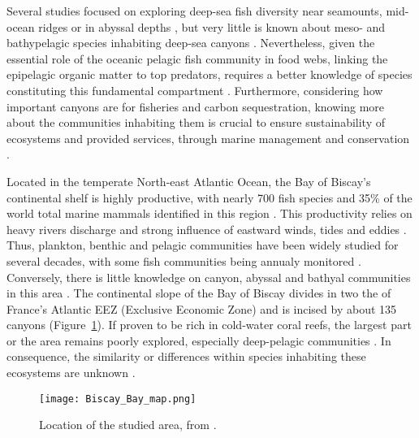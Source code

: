 
Several studies focused on exploring deep-sea fish diversity near seamounts, mid-ocean ridges or in abyssal depths \citep{cook2013,sutton2013}, but very little is known about meso- and bathypelagic species inhabiting deep-sea canyons \citep{kenchington2020}. Nevertheless, given the essential role of the oceanic pelagic fish community in food webs, linking the epipelagic organic matter to top predators, requires a better knowledge of species constituting this fundamental compartment \citep{davison2015,gaskett2001}. Furthermore, considering how important canyons are for fisheries and carbon sequestration, knowing more about the communities inhabiting them is crucial to ensure sustainability of ecosystems and provided services, through marine management and conservation \citep{fernandez-arcaya2017,vandenbeld2017a}.

Located in the temperate North-east Atlantic Ocean, the Bay of Biscay's continental shelf is highly productive, with nearly 700 fish species and 35\% of the world total marine mammals identified in this region \citep{borja2019}. This productivity relies on heavy rivers discharge and strong influence of eastward winds, tides and eddies \citep{borja2019,akpinar2020}. Thus, plankton, benthic and pelagic communities have been widely studied for several decades, with some fish communities being annualy monitored \citep{borja2019,doray2018}. Conversely, there is little knowledge on canyon, abyssal and bathyal communities in this area \citep{borja2019}. The continental slope of the Bay of Biscay divides in two the of France's Atlantic EEZ (Exclusive Economic Zone) and is incised by about 135 canyons \citep{bourillet2006,spitz2019,vandenbeld2017} (Figure~\ref{fig:bbm}). If proven to be rich in cold-water coral reefs, the largest part or the area remains poorly explored, especially deep-pelagic communities \citep{garcia2021,vandenbeld2017a,webb2010}. In consequence, the similarity or differences within species inhabiting these ecosystems are unknown \citep{kenchington2020}. 

\begin{figure} [!htbp]
	\begin{center}
		\texttt{[image: Biscay\_Bay\_map.png]}
	\end{center}
	\caption[Map of the studied area]{Location of the studied area, from \citep{bearez2017}.}
	\label{fig:bbm}
\end{figure}

